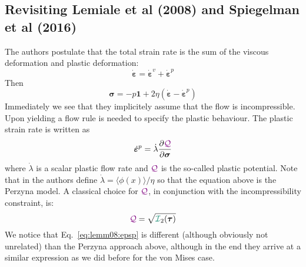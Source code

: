\subsection{Revisiting Lemiale et al (2008) and Spiegelman et al (2016) }
The authors postulate that the total strain rate is the sum of 
the viscous deformation and plastic deformation:
\[
\dot{\bm \varepsilon} = \dot{\bm \varepsilon}^v + \dot{\bm \varepsilon}^p
\]
Then 
\begin{equation}
\bm \sigma = -p \bm 1 + 2\eta (\dot{\bm \varepsilon} -\dot{\bm \varepsilon}^p)
\label{eq:abcd}
\end{equation}
Immediately we see that they implicitely assume that the flow is incompressible.
Upon yielding a flow rule is needed to specify the plastic 
behaviour. The plastic strain rate is written as
\begin{equation}
\label{eq:lemm08:epsp}
\dot{\bm \varepsilon}^p = \dot\lambda \frac{\partial {\color{violet}\cal Q}}{\partial \bm\sigma}
\end{equation}
where $\dot\lambda$ is a scalar plastic flow rate and ${\color{violet}\cal Q}$ is the so-called plastic potential. 
Note that in \textcite{hesd02} the authors define $\dot{\lambda}=\langle \phi(x) \rangle/\eta$
so that the equation above is the Perzyna model. 
A classical choice for ${\color{violet}\cal Q}$, in conjunction with the incompressibility constraint, is:
\[
\QQQ = \sqrt{ {\III}_2(\bm\tau)}
\]
We notice that Eq.~\ref{eq:lemm08:epsp} is different (although obviously not unrelated) 
than the Perzyna approach above, although
in the end they arrive at a similar expression as we did before for the von Mises case.


